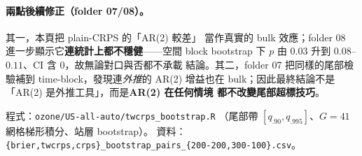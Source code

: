\documentclass[12pt]{article}
\begin{document}
\paragraph{兩點後續修正（folder 07/08）。}其一，本頁把 plain-CRPS 的「AR(2) 較差」
當作真實的 bulk 效應；folder 08 進一步顯示它\textbf{連統計上都不穩健}——空間 block
bootstrap 下 $p$ 由 $0.03$ 升到 $0.08$--$0.11$、CI 含 $0$，故無論對口與否都不承載
結論。其二，folder 07 把同樣的尾部檢驗補到 time-block，發現連\emph{外推}的 AR(2)
增益也在 bulk；因此最終結論不是「AR(2) 是外推工具」，而是\textbf{AR(2) 在任何情境
都不改變尾部超標技巧}。

\medskip
\noindent\footnotesize 程式：\verb|ozone/US-all-auto/twcrps_bootstrap.R|
（尾部帶 $[q_{.90},q_{.995}]$、$G{=}41$ 網格梯形積分、站層 bootstrap）。
資料：\verb|{brier,twcrps,crps}_bootstrap_pairs_{200-200,300-100}.csv|。
\end{document}
